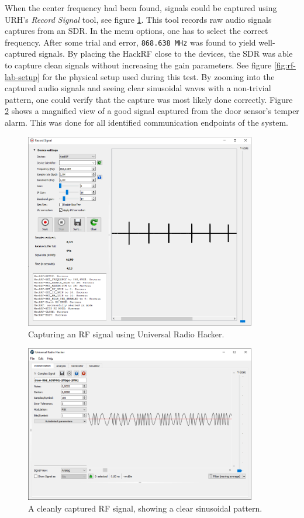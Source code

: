 When the center frequency had been found, signals could be captured using URH's \textit{Record Signal} tool, see figure \ref{fig:rf-signal-capture}. This tool records raw audio signals captures from an SDR. In the menu options, one has to select the correct frequency. After some trial and error, \texttt{868.638 MHz} was found to yield well-captured signals. By placing the HackRF close to the devices, the SDR was able to capture clean signals without increasing the gain parameters. See figure \ref{fig:rf-lab-setup} for the physical setup used during this test. By zooming into the captured audio signals and seeing clear sinusoidal waves with a non-trivial pattern, one could verify that the capture was most likely done correctly. Figure \ref{fig:zoomed-in-signal} shows a magnified view of a good signal captured from the door sensor's temper alarm. This was done for all identified communication endpoints of the system.
\begin{figure}[!ht]
    \centering
    \includegraphics[width=0.9\textwidth]{images/6-pentesting/signal-capture.png}
    \caption{Capturing an RF signal using Universal Radio Hacker.}
    \label{fig:rf-signal-capture}
\end{figure}
\begin{figure}[!ht]
    \centering
    \includegraphics[width=0.9\textwidth]{images/6-pentesting/zoomed-in-signal.png}
    \caption{A cleanly captured RF signal, showing a clear sinusoidal pattern.}
    \label{fig:zoomed-in-signal}
\end{figure}

